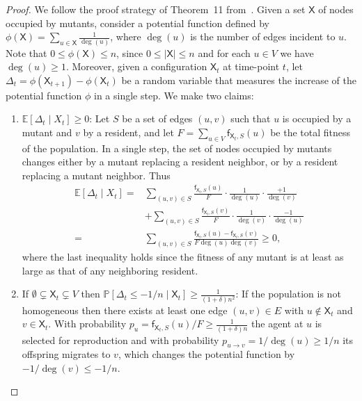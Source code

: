 \documentclass[letterpaper]{article}
\def\Pr{\mathbb{P}}
\newcommand{\Fitness}{\mathsf{f}}
\newcommand{\X}{\mathsf{X}}
\newcommand{\E}{\mathbb{E}}
\newcommand{\FitAdv}{\delta}
\begin{document}
\thmapproxfixprob*
\begin{proof}
We follow the proof strategy of Theorem~11 from~\cite{Diaz2014}.
Given a set $\X$ of nodes occupied by mutants, consider a potential function defined by
$\phi(\X)=\sum_{u\in\X} \frac1{\deg(u)}$, where $\deg(u)$ is the number of edges incident to $u$.
Note that $0\le \phi(\X)\le n$, since $0\le |\X|\le n$ and for each $u\in V$ we have $\deg(u)\ge 1$.
Moreover, given a configuration $\X_t$ at time-point $t$, let $\Delta_t=\phi(\X_{t+1})-\phi(\X_t)$ be a random variable that measures the increase of the potential function $\phi$ in a single step.
We make two claims:
\begin{enumerate}

\item\label{itm:fpras1}
$\E[\Delta_t\mid X_t]\ge 0$: Let $S$ be a set of edges $(u,v)$ such that $u$ is occupied by a mutant and $v$ by a resident, and let $F=\sum_{u\in V} \Fitness_{\X_t,S}(u)$ be the total fitness of the population.
In a single step, the set of nodes occupied by mutants changes either by a mutant replacing a resident neighbor, or by a resident replacing a mutant neighbor. Thus
\begin{align*}
\E[\Delta_t\mid X_t] =&\sum_{(u,v)\in S} \frac{\Fitness_{\X_t,S}(u)}{F}\cdot\frac1{\deg(u)}\cdot\frac{+1}{\deg(v)}\\
&+\sum_{(u,v)\in S}\frac{\Fitness_{\X_t,S}(v)}{F}\cdot\frac1{\deg(v)}\cdot\frac{-1}{\deg(u)} \\
 =& \sum_{(u,v)\in S} \frac{\Fitness_{\X_t,S}(u)-\Fitness_{\X_t,S}(v)}{F\deg(u)\deg(v)}\ge 0,
 \end{align*}
 where the last inequality holds since the fitness of any mutant is at least as large as that of any neighboring resident.

\item\label{itm:fpras2}
If $\emptyset\subsetneq \X_t \subsetneq V$ then $\Pr[\Delta_t\le -1/n \mid \X_t]\ge \frac1{(1+\FitAdv)n^2}$:
If the population is not homogeneous then there exists at least one edge $(u,v)\in E$ with $u\not\in\X_t$ and $v\in\X_t$.
With probability $p_u=\Fitness_{\X_t,S}(u)/F\ge\frac1{(1+\FitAdv)n}$ the agent at $u$ is selected for reproduction and with probability $p_{u\to v}=1/\deg(u)\ge 1/n$ its offspring migrates to $v$, which changes the potential function by $-1/\deg(v)\le -1/n$.
\end{enumerate}


\end{proof}
\end{document}
